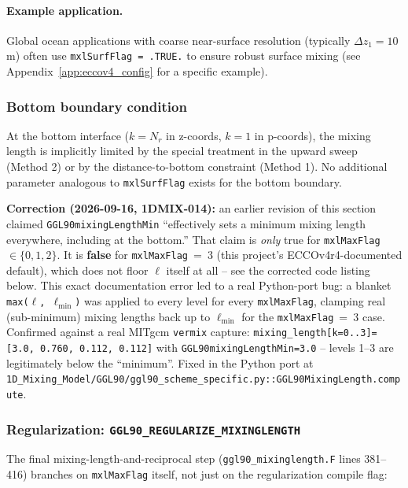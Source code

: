 \documentclass[12pt,letterpaper]{article}
\begin{document}
\paragraph{Example application.} Global ocean applications with coarse near-surface resolution (typically $\Delta z_1 = 10$ m) often use \verb|mxlSurfFlag = .TRUE.| to ensure robust surface mixing (see Appendix~\ref{app:eccov4_config} for a specific example).

\subsubsection{Bottom boundary condition}

At the bottom interface ($k = N_r$ in z-coords, $k = 1$ in p-coords), the mixing length is implicitly limited by the special treatment in the upward sweep (Method 2) or by the distance-to-bottom constraint (Method 1). No additional parameter analogous to \verb|mxlSurfFlag| exists for the bottom boundary.

\textbf{Correction (2026-09-16, 1DMIX-014):} an earlier revision of this section claimed
\verb|GGL90mixingLengthMin| ``effectively sets a minimum mixing length everywhere, including
at the bottom.'' That claim is \emph{only} true for \verb|mxlMaxFlag| $\in \{0,1,2\}$. It is
\textbf{false} for \verb|mxlMaxFlag|~=~3 (this project's ECCOv4r4-documented default), which
does not floor $\ell$ itself at all -- see the corrected code listing below. This exact
documentation error led to a real Python-port bug: a blanket \texttt{max($\ell$,~$\ell_{\min}$)}
was applied to every level for every \verb|mxlMaxFlag|, clamping real (sub-minimum) mixing
lengths back up to $\ell_{\min}$ for the \verb|mxlMaxFlag|~=~3 case. Confirmed against a real
MITgcm \texttt{vermix} capture: \verb|mixing_length[k=0..3]=[3.0, 0.760, 0.112, 0.112]| with
\verb|GGL90mixingLengthMin=3.0| -- levels 1--3 are legitimately below the ``minimum''. Fixed in
the Python port at \verb|1D_Mixing_Model/GGL90/ggl90_scheme_specific.py::GGL90MixingLength.compute|.

\subsubsection{Regularization: \texttt{GGL90\_REGULARIZE\_MIXINGLENGTH}}

The final mixing-length-and-reciprocal step (\verb|ggl90_mixinglength.F| lines 381--416)
branches on \verb|mxlMaxFlag| itself, not just on the regularization compile flag:
\end{document}
